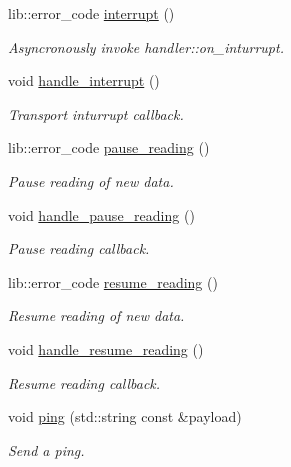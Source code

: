 \begin{DoxyCompactItemize}
lib\+::error\+\_\+code \mbox{\hyperlink{classwebsocketpp_1_1connection_a12bbbc93d414c65492ffb2c4a12f05a8}{interrupt}} ()
\begin{DoxyCompactList}\small\item\em Asyncronously invoke handler\+::on\+\_\+inturrupt. \end{DoxyCompactList}\item 
\mbox{\label{classwebsocketpp_1_1connection_a0b438ac986b73c99907515eeac6dc45f}} 
void \mbox{\hyperlink{classwebsocketpp_1_1connection_a0b438ac986b73c99907515eeac6dc45f}{handle\+\_\+interrupt}} ()
\begin{DoxyCompactList}\small\item\em Transport inturrupt callback. \end{DoxyCompactList}\item 
lib\+::error\+\_\+code \mbox{\hyperlink{classwebsocketpp_1_1connection_ad6a4a25a18ec61d2a36a149a3d92ab72}{pause\+\_\+reading}} ()
\begin{DoxyCompactList}\small\item\em Pause reading of new data. \end{DoxyCompactList}\item 
void \mbox{\hyperlink{classwebsocketpp_1_1connection_a5887284ea346efd7b5cc43519bfd84d5}{handle\+\_\+pause\+\_\+reading}} ()
\begin{DoxyCompactList}\small\item\em Pause reading callback. \end{DoxyCompactList}\item 
lib\+::error\+\_\+code \mbox{\hyperlink{classwebsocketpp_1_1connection_a355b5e155ba53071b06fa8a6dfab9be2}{resume\+\_\+reading}} ()
\begin{DoxyCompactList}\small\item\em Resume reading of new data. \end{DoxyCompactList}\item 
void \mbox{\hyperlink{classwebsocketpp_1_1connection_adb5b479b7d66eb289390b26d12332d84}{handle\+\_\+resume\+\_\+reading}} ()
\begin{DoxyCompactList}\small\item\em Resume reading callback. \end{DoxyCompactList}\item 
void \mbox{\hyperlink{classwebsocketpp_1_1connection_a21c8dc6badfaff3aaee1434625c09b04}{ping}} (std\+::string const \&payload)
\begin{DoxyCompactList}\small\item\em Send a ping. \end{DoxyCompactList}\item 

\end{DoxyCompactItemize}
